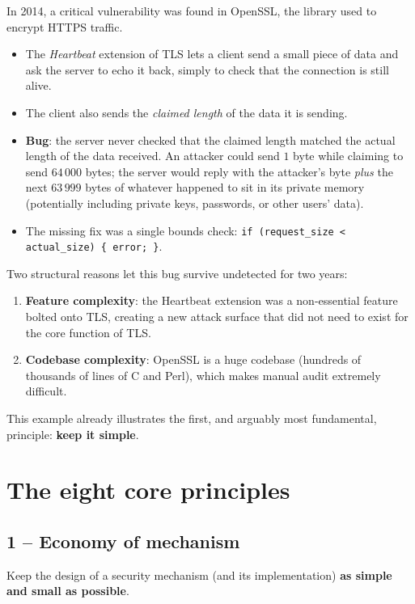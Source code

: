 \begin{example}
In 2014, a critical vulnerability was found in OpenSSL, the library used to encrypt HTTPS traffic.
\begin{itemize}
    \item The \emph{Heartbeat} extension of TLS lets a client send a small piece of data and ask the server to echo it back, simply to check that the connection is still alive.
    \item The client also sends the \emph{claimed length} of the data it is sending.
    \item \textbf{Bug}: the server never checked that the claimed length matched the actual length of the data received. An attacker could send $1$ byte while claiming to send $64\,000$ bytes; the server would reply with the attacker's byte \emph{plus} the next $63\,999$ bytes of whatever happened to sit in its private memory (potentially including private keys, passwords, or other users' data).
    \item The missing fix was a single bounds check: \verb|if (request_size < actual_size) { error; }|.
\end{itemize}
Two structural reasons let this bug survive undetected for two years:
\begin{enumerate}
    \item \textbf{Feature complexity}: the Heartbeat extension was a non-essential feature bolted onto TLS, creating a new attack surface that did not need to exist for the core function of TLS.
    \item \textbf{Codebase complexity}: OpenSSL is a huge codebase (hundreds of thousands of lines of C and Perl), which makes manual audit extremely difficult.
\end{enumerate}
\end{example}

This example already illustrates the first, and arguably most fundamental, principle: \textbf{keep it simple}.

\section{The eight core principles}

\subsection{1 -- Economy of mechanism}

\begin{definition}
Keep the design of a security mechanism (and its implementation) \textbf{as simple and small as possible}.
\end{definition}


